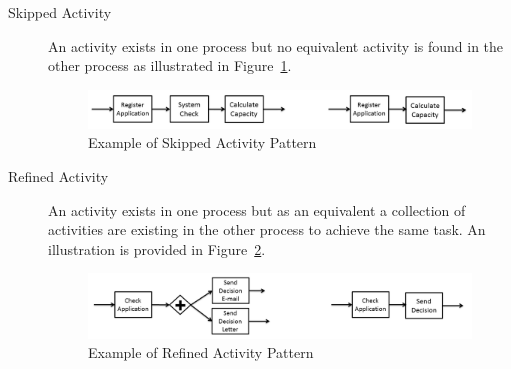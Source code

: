 \begin{description}
  \item[Skipped Activity] An activity exists in one process but no equivalent activity is found in the other process as illustrated in Figure~\ref{fig:skipped-activity}.
      \begin{figure}
      \centering
      \includegraphics[width=\textwidth]{3_background/mismatch-patterns-skipped-activity}
      \caption{Example of Skipped Activity Pattern}
      \label{fig:skipped-activity}
      \end{figure}
  \item[Refined Activity] An activity exists in one process but as an equivalent a collection of activities are existing in the other process to achieve the same task. An illustration is provided in Figure~\ref{fig:refined-activity}. 
      \begin{figure}
      \centering
      \includegraphics[width=\textwidth]{3_background/mismatch-patterns-refined-activity}
      \caption{Example of Refined Activity Pattern}
      \label{fig:refined-activity}
      \end{figure}
\end{description}
 
